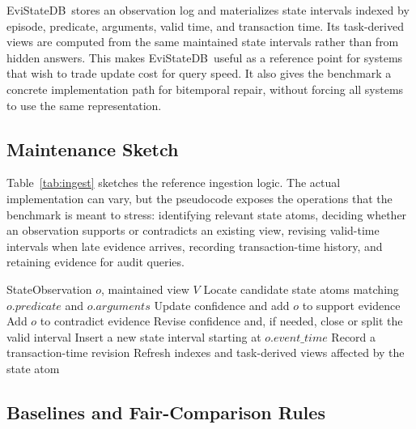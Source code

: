\documentclass[conference]{IEEEtran}
\newcommand{\engine}{EviStateDB}
\begin{document}
\engine\ stores an observation log and materializes state intervals indexed by episode, predicate, arguments, valid time, and transaction time. Its task-derived views are computed from the same maintained state intervals rather than from hidden answers. This makes \engine\ useful as a reference point for systems that wish to trade update cost for query speed. It also gives the benchmark a concrete implementation path for bitemporal repair, without forcing all systems to use the same representation.

\subsection{Maintenance Sketch}

Table~\ref{tab:ingest} sketches the reference ingestion logic. The actual implementation can vary, but the pseudocode exposes the operations that the benchmark is meant to stress: identifying relevant state atoms, deciding whether an observation supports or contradicts an existing view, revising valid-time intervals when late evidence arrives, recording transaction-time history, and retaining evidence for audit queries.

\begin{table}[!t]
\caption{Reference ingestion in \engine.}
\label{tab:ingest}
\centering
\footnotesize
\begin{minipage}{0.96\columnwidth}
\begin{algorithmic}[1]
\REQUIRE StateObservation $o$, maintained view $V$
\STATE Locate candidate state atoms matching $o.predicate$ and $o.arguments$
    \STATE Update confidence and add $o$ to support evidence
    \STATE Add $o$ to contradict evidence
    \STATE Revise confidence and, if needed, close or split the valid interval
\ELSE
    \STATE Insert a new state interval starting at $o.event\_time$
\ENDIF
{}
    \STATE Record a transaction-time revision
\ENDIF
\STATE Refresh indexes and task-derived views affected by the state atom
\end{algorithmic}
\end{minipage}
\end{table}

\subsection{Baselines and Fair-Comparison Rules}
\end{document}
